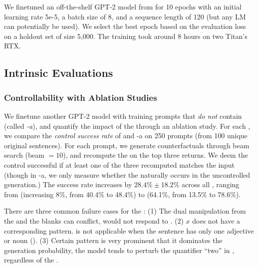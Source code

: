 We finetuned an off-the-shelf GPT-2 model from \citet{Wolf2019HuggingFacesTS} for 10 epochs with an initial learning rate 5e-5, a batch size of 8, and a sequence length of 120 (but any LM can potentially be used).
We select the best epoch based on the evaluation loss on a holdout set of size 5,000.
The training took around 8 hours on two Titan's RTX.


\subsection{Intrinsic Evaluations}
\label{appendix:intrinsic}



\subsubsection{Controllability with Ablation Studies}
\label{appendix:ablation_control}

We finetune another GPT-2 model with training prompts that \emph{do not} contain \tagstrs (called \emph{\sysname-a}), and quantify the impact of the \tagstrshorts through an ablation study.
For each \tagstr, we compare the \emph{control success rate} of \sysname and \sysname-a on 250 prompts (from 100 unique original sentences).
For each prompt, we generate counterfactuals through beam search (beam $=10$), and recompute the \tagstrshorts on the top three returns.
We deem the control successful if at least one of the three recomputed \tagstrshorts matches the input (though in \sysname-a, we only measure whether the \tagstrshort naturally occurs in the uncontrolled generation.)
The success rate increases by $28.4\% \pm 18.2\%$ across all \tagstrs, ranging from  (increasing 8\%, from 40.4\% to 48.4\%) to  (64.1\%, from 13.5\% to 78.6\%).

There are three common failure cases for the \tagstrshorts:
(1) The dual manipulation from the \tagstrs and the blanks can conflict, \eg {} would not respond to .
(2) $x$ does not have a corresponding pattern.  is not applicable when the sentence has only one adjective or noun (\eg {}).
(3) Certain pattern is very prominent that it dominates the generation probability, \eg the model tends to perturb the quantifier ``two'' in , regardless of the \tagstrshort.




